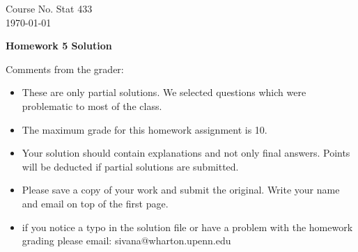 \documentclass{article}
\begin{document}
\begin{flushleft}
Course No. Stat 433 \\
\today
\end{flushleft}

\begin{center}
{\Large{\bf  Homework 5 Solution}}
\end{center}

\textcolor[rgb]{0.98,0.00,0.00}{Comments from the grader:}
\begin{itemize}

    \item \textcolor[rgb]{0.98,0.00,0.00}{These are only partial solutions.  We selected
    questions which were problematic to most of the class.}
    \item \textcolor[rgb]{0.98,0.00,0.00}{The maximum grade for this homework assignment is 10.}
    \item \textcolor[rgb]{0.98,0.00,0.00}{Your solution should contain explanations and not only
    final answers. Points will be deducted if partial solutions
    are submitted.}
    \item \textcolor[rgb]{0.98,0.00,0.00}{Please save a copy of your work and submit the original.
    Write your name and email on top of the first page.}
    \item \textcolor[rgb]{0.98,0.00,0.00}{if you notice a typo in the solution file or have a problem with the homework
    grading please email: sivana@wharton.upenn.edu
}
\end{itemize}
\end{document}
